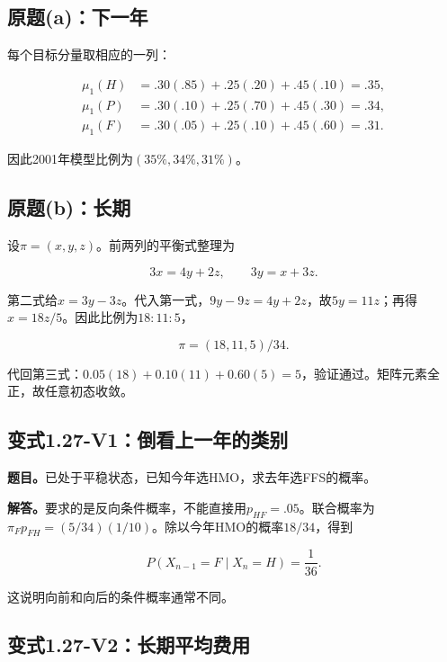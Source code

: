 \documentclass[
  11pt,
  a4paper,
  UTF8,
  fontset=fandol]{ctexart}
\begin{document}
\subsection{原题(a)：下一年}\label{ux539fux9898aux4e0bux4e00ux5e74}

每个目标分量取相应的一列：

\[
\begin{aligned}
\mu_1(H)&=.30(.85)+.25(.20)+.45(.10)=.35,\\
\mu_1(P)&=.30(.10)+.25(.70)+.45(.30)=.34,\\
\mu_1(F)&=.30(.05)+.25(.10)+.45(.60)=.31.
\end{aligned}
\]

因此2001年模型比例为\(\boxed{(35\%,34\%,31\%)}\)。

\subsection{原题(b)：长期}\label{ux539fux9898bux957fux671f}

设\(\pi=(x,y,z)\)。前两列的平衡式整理为

\[
3x=4y+2z,\qquad 3y=x+3z.
\]

第二式给\(x=3y-3z\)。代入第一式，\(9y-9z=4y+2z\)，故\(5y=11z\)；再得\(x=18z/5\)。因此比例为\(18:11:5\)，

\[
\boxed{\pi=(18,11,5)/34.}
\]

代回第三式：\(0.05(18)+0.10(11)+0.60(5)=5\)，验证通过。矩阵元素全正，故任意初态收敛。

\subsection{变式1.27-V1：倒看上一年的类别}\label{ux53d8ux5f0f1.27-v1ux5012ux770bux4e0aux4e00ux5e74ux7684ux7c7bux522b}

\textbf{题目。}已处于平稳状态，已知今年选HMO，求去年选FFS的概率。

\textbf{解答。}要求的是反向条件概率，不能直接用\(p_{HF}=.05\)。联合概率为\(\pi_Fp_{FH}=(5/34)(1/10)\)。除以今年HMO的概率\(18/34\)，得到

\[
\boxed{P(X_{n-1}=F\mid X_n=H)=\frac1{36}.}
\]

这说明向前和向后的条件概率通常不同。

\subsection{变式1.27-V2：长期平均费用}\label{ux53d8ux5f0f1.27-v2ux957fux671fux5e73ux5747ux8d39ux7528}
\end{document}
